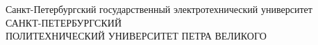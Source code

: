 \thispagestyle{empty}%
{}




\begin{center}%
	Санкт-Петербургский государственный электротехнический университет\\
			\noindent\makebox[\linewidth]{\rule{0.33\textwidth}{1.3pt}} %
	\MakeUppercase{Санкт-Петербургский } \\ \MakeUppercase{политехнический университет Петра Великого}
	\noindent\makebox[\linewidth]{\rule{\textwidth}{1.3pt}}
\end{center}%


%
%

%
%
\vspace{0pt plus4fill} %

%


